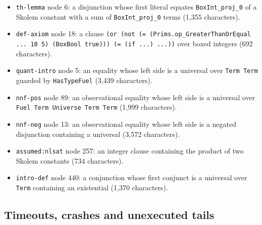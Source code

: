 \documentclass[10pt,a4paper]{article}
\begin{document}
\begin{itemize}\setlength{\itemsep}{1pt}\setlength{\parskip}{0pt}

\item \texttt{th-{}\allowbreak{}lemma} node 6: a disjunction whose first literal equates \texttt{BoxInt\_\allowbreak{}proj\_\allowbreak{}0} of a Skolem constant with a sum of \texttt{BoxInt\_\allowbreak{}proj\_\allowbreak{}0} terms (1,355 characters).

\item \texttt{def-{}\allowbreak{}axiom} node 18: a clause \texttt{(\allowbreak{}or (\allowbreak{}not (\allowbreak{}=\allowbreak{} (\allowbreak{}Prims.\allowbreak{}op\_\allowbreak{}GreaterThanOrEqu\allowbreak{}al .\allowbreak{}.\allowbreak{}.\allowbreak{} 10 5) (\allowbreak{}BoxBool true))) (\allowbreak{}=\allowbreak{} (\allowbreak{}if .\allowbreak{}.\allowbreak{}.\allowbreak{}) .\allowbreak{}.\allowbreak{}.\allowbreak{}))} over boxed integers (692 characters).

\item \texttt{quant-{}\allowbreak{}intro} node 5: an equality whose left side is a universal over \texttt{Term Term} guarded by \texttt{HasTypeFuel} (3,439 characters).

\item \texttt{nnf-{}\allowbreak{}pos} node 89: an observational equality whose left side is a universal over \texttt{Fuel Term Universe Term Term} (1,999 characters).

\item \texttt{nnf-{}\allowbreak{}neg} node 13: an observational equality whose left side is a negated disjunction containing a universal (3,572 characters).

\item \texttt{assumed:\allowbreak{}nlsat} node 257: an integer clause containing the product of two Skolem constants (734 characters).

\item \texttt{intro-{}\allowbreak{}def} node 440: a conjunction whose first conjunct is a universal over \texttt{Term} containing an existential (1,370 characters).

\end{itemize}

\subsection{Timeouts, crashes and unexecuted tails}\label{sec:a6-timeouts-crashes-and-unexecuted-tails}
\end{document}
